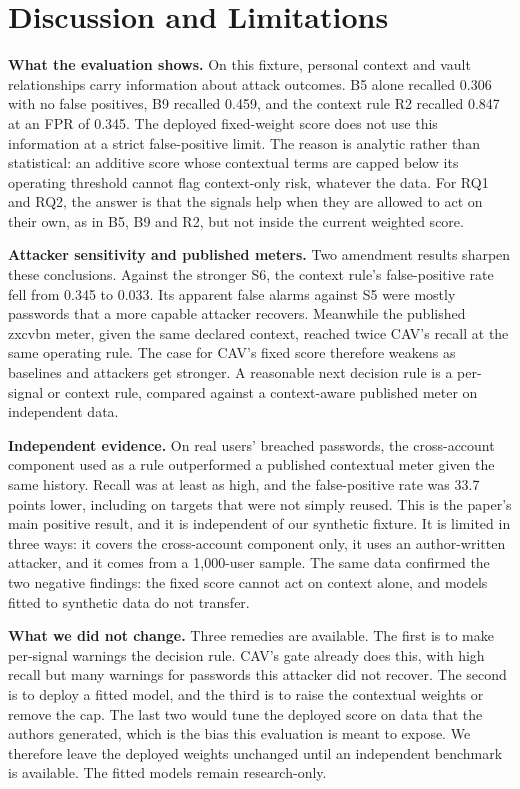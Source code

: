 \documentclass[conference]{IEEEtran}
\begin{document}
\section{Discussion and Limitations}
\textbf{What the evaluation shows.} On this fixture, personal context and vault relationships carry information about attack outcomes. B5 alone recalled 0.306 with no false positives, B9 recalled 0.459, and the context rule R2 recalled 0.847 at an FPR of 0.345. The deployed fixed-weight score does not use this information at a strict false-positive limit. The reason is analytic rather than statistical: an additive score whose contextual terms are capped below its operating threshold cannot flag context-only risk, whatever the data. For RQ1 and RQ2, the answer is that the signals help when they are allowed to act on their own, as in B5, B9 and R2, but not inside the current weighted score.

\textbf{Attacker sensitivity and published meters.} Two amendment results sharpen these conclusions. Against the stronger S6, the context rule's false-positive rate fell from 0.345 to 0.033. Its apparent false alarms against S5 were mostly passwords that a more capable attacker recovers. Meanwhile the published zxcvbn meter, given the same declared context, reached twice CAV's recall at the same operating rule. The case for CAV's fixed score therefore weakens as baselines and attackers get stronger. A reasonable next decision rule is a per-signal or context rule, compared against a context-aware published meter on independent data.

\textbf{Independent evidence.} On real users' breached passwords, the cross-account component used as a rule outperformed a published contextual meter given the same history. Recall was at least as high, and the false-positive rate was 33.7 points lower, including on targets that were not simply reused. This is the paper's main positive result, and it is independent of our synthetic fixture. It is limited in three ways: it covers the cross-account component only, it uses an author-written attacker, and it comes from a 1,000-user sample. The same data confirmed the two negative findings: the fixed score cannot act on context alone, and models fitted to synthetic data do not transfer.

\textbf{What we did not change.} Three remedies are available. The first is to make per-signal warnings the decision rule. CAV's gate already does this, with high recall but many warnings for passwords this attacker did not recover. The second is to deploy a fitted model, and the third is to raise the contextual weights or remove the cap. The last two would tune the deployed score on data that the authors generated, which is the bias this evaluation is meant to expose. We therefore leave the deployed weights unchanged until an independent benchmark is available. The fitted models remain research-only.
\end{document}
